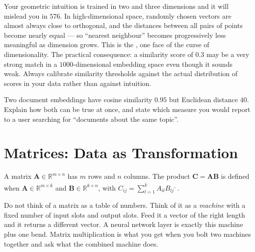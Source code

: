 \begin{cautionbox}
Your geometric intuition is trained in two and three dimensions and it will
mislead you in $576$. In high-dimensional space, randomly chosen vectors are
almost always close to orthogonal, and the distances between all pairs of
points become nearly equal --- so ``nearest neighbour'' becomes progressively
less meaningful as dimension grows. This is the , one face of the curse of dimensionality. The practical consequence:
a similarity score of $0.3$ may be a very strong match in a $1000$-dimensional
embedding space even though it sounds weak. Always calibrate similarity
thresholds against the actual distribution of scores in your data rather than
against intuition.
\end{cautionbox}

\begin{checkpoint}
Two document embeddings have cosine similarity $0.95$ but Euclidean distance
$40$. Explain how both can be true at once, and state which measure you would
report to a user searching for ``documents about the same topic''.
\end{checkpoint}

\section{Matrices: Data as Transformation}

A matrix $\mathbf{A}\in\mathbb{R}^{m\times n}$ has $m$ rows and $n$ columns.
The product $\mathbf{C} = \mathbf{A}\mathbf{B}$ is defined when
$\mathbf{A}\in\mathbb{R}^{m\times k}$ and $\mathbf{B}\in\mathbb{R}^{k\times n}$,
with $C_{ij} = \sum_{l=1}^{k} A_{il}B_{lj}$\textsuperscript{\cite{cherneyLinearAlgebra2013},
\cite[][ch.~2]{strangIntroductionLinearAlgebra2016}}.

\begin{plainlanguage}
Do not think of a matrix as a table of numbers. Think of it as a \emph{machine}
with a fixed number of input slots and output slots. Feed it a vector of the
right length and it returns a different vector. A neural network layer is
exactly this machine plus one bend. Matrix multiplication is what you get when
you bolt two machines together and ask what the combined machine does.
\end{plainlanguage}

